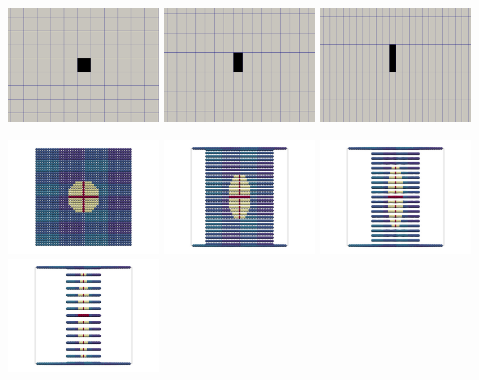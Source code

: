 \begin{center}
\includegraphics[width=4cm]{python_codes/fieldstone_89/results/biaxial/target0000}
\includegraphics[width=4cm]{python_codes/fieldstone_89/results/biaxial/target0005}
\includegraphics[width=4cm]{python_codes/fieldstone_89/results/biaxial/target0010}
\end{center}

\begin{center}
\includegraphics[width=4cm]{python_codes/fieldstone_89/results/biaxial/paint0000}
\includegraphics[width=4cm]{python_codes/fieldstone_89/results/biaxial/paint0005}
\includegraphics[width=4cm]{python_codes/fieldstone_89/results/biaxial/paint0010}
\includegraphics[width=4cm]{python_codes/fieldstone_89/results/biaxial/paint0015}
\end{center}

